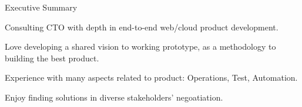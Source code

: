 \documentclass{resume} %
\begin{document}

\begin{rSection}{Executive Summary}
\item Consulting CTO with depth in end-to-end web/cloud product development.
\item Love developing a shared vision to working prototype, as a methodology to building the best product.
\item Experience with many aspects related to product: Operations, Test, Automation.
\item Enjoy finding solutions in diverse stakeholders' negoatiation.
\end{rSection}
\end{document}
